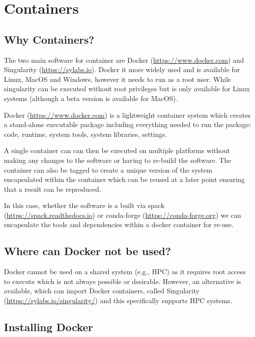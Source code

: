 \documentclass[authoryear, 11pt, oneside]{report}
\begin{document}
\tableofcontents

\chapter{Containers}

\section{Why Containers?}

The two main software for container are Docker (\url{https://www.docker.com}) and Singularity (\url{https://sylabs.io}). Docker it more widely used and is available for Linux, MacOS and Windows, however it needs to run as a root user. While singularity can be executed without root privileges but is only available for Linux systems (although a beta version is available for MacOS).

Docker (\url{https://www.docker.com}) is a lightweight container system which creates a stand-alone executable package including everything needed to run the package: code, runtime, system tools, system libraries, settings.

A single container can can then be executed on multiple platforms without making any changes to the software or having to re-build the software. The container can also be tagged to create a unique version of the system encapsulated within the container which can be reused at a later point ensuring that a result can be reproduced.

In this case, whether the software is a built via spack (\url{https://spack.readthedocs.io}) or conda-forge (\url{https://conda-forge.org}) we can encapsulate the tools and dependencies within a docker container for re-use. 

\section{Where can Docker not be used?}

Docker cannot be used on a shared system (e.g., HPC) as it requires root access to execute which is not always possible or desirable. However, an alternative is available, which can import Docker containers, called Singularity (\url{https://sylabs.io/singularity/}) and this specifically supports HPC systems.

\section{Installing Docker}
\end{document}
